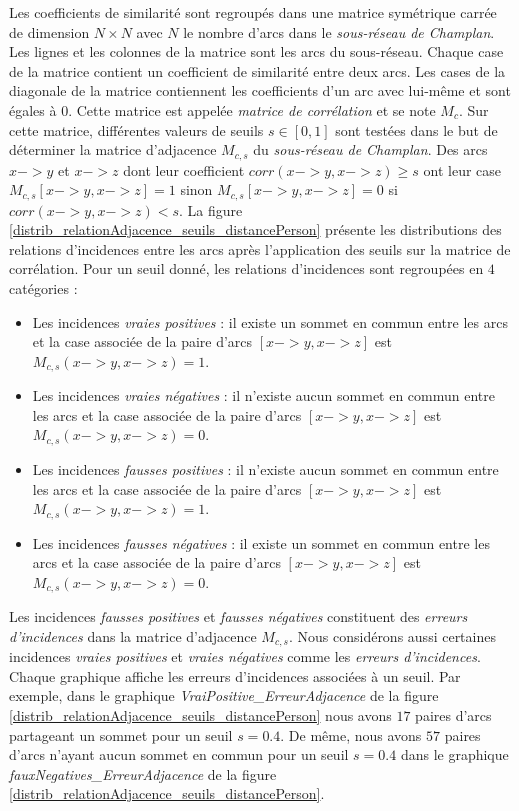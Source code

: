 Les coefficients de similarit\'e sont regroup\'es dans une matrice sym\'etrique  carr\'ee de dimension $N \times N$ avec $N$ le nombre d'arcs dans le {\em sous-r\'eseau de Champlan}.
Les lignes et les colonnes de la matrice sont les arcs du sous-r\'eseau. Chaque case de la matrice contient un coefficient de similarit\'e entre deux arcs. Les cases de la diagonale de la matrice contiennent les coefficients d'un arc avec lui-m\^eme et sont \'egales \`a $0$.  
Cette matrice est appel\'ee {\em matrice de corr\'elation} et se note $M_c$.
Sur cette matrice, diff\'erentes valeurs de seuils $s \in [0,1]$ sont test\'ees dans le but de d\'eterminer la matrice d'adjacence $M_{c,s}$ du {\em sous-r\'eseau de Champlan}. 
Des arcs $x->y$ et $x->z$ dont leur coefficient $corr(x->y, x->z) \ge s$ ont leur case $M_{c,s}[x->y, x->z] = 1$ sinon $M_{c,s}[x->y, x->z] = 0$ si $corr(x->y, x->z) < s$. 
La figure \ref{distrib_relationAdjacence_seuils_distancePerson} pr\'esente les distributions des relations d'incidences entre les arcs apr\`es l'application  des seuils sur la matrice de corr\'elation. Pour un seuil donn\'e, les relations d'incidences sont regroup\'ees en $4$ cat\'egories :
\begin{itemize}
	\item Les incidences {\em vraies positives} : il existe un sommet en commun entre les arcs et la case associ\'ee de la paire d'arcs $[x->y, x->z]$ est $M_{c,s}(x->y, x->z) = 1$. 
	\item Les incidences {\em vraies n\'egatives} : il n'existe aucun sommet en commun entre les arcs et la case associ\'ee de la paire d'arcs $[x->y, x->z]$ est $M_{c,s}(x->y, x->z) = 0$. 
	\item Les incidences {\em fausses positives} :  il n'existe aucun sommet en commun entre les arcs et la case associ\'ee de la paire d'arcs $[x->y, x->z]$ est $M_{c,s}(x->y, x->z) = 1$. 
	\item Les incidences {\em fausses n\'egatives} :  il existe un sommet en commun entre les arcs et la case associ\'ee de la paire d'arcs $[x->y, x->z]$ est $M_{c,s}(x->y, x->z) = 0$. 
\end{itemize}
Les incidences {\em fausses positives} et {\em fausses n\'egatives} constituent des {\em erreurs d'incidences} dans la matrice d'adjacence $M_{c,s}$. Nous consid\'erons aussi certaines incidences {\em vraies positives}  et {\em vraies n\'egatives} comme les {\em erreurs d'incidences}.
Chaque graphique affiche les erreurs d'incidences associ\'ees \`a un seuil. Par exemple, dans le graphique {\em VraiPositive\_ErreurAdjacence} de la figure \ref{distrib_relationAdjacence_seuils_distancePerson} nous avons $17$ paires d'arcs partageant un sommet pour un seuil $s=0.4$. De m\^eme, nous avons $57$ paires d'arcs n'ayant aucun sommet en commun pour un seuil $s=0.4$ dans le graphique {\em fauxNegatives\_ErreurAdjacence} de la figure \ref{distrib_relationAdjacence_seuils_distancePerson}. 
